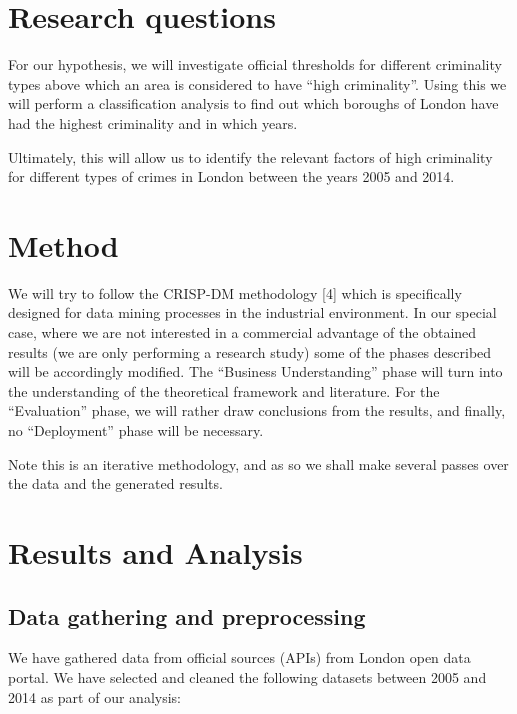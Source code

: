 \documentclass[12pt, openany]{report}
\begin{document}
\section{Research questions}

For our hypothesis, we will investigate official thresholds for different criminality types above which an area is considered to have “high criminality”. Using this we will perform a classification analysis to find out which boroughs of London have had the highest criminality and in which years.

Ultimately, this will allow us to identify the relevant factors of high criminality for different types of crimes in London between the years 2005 and 2014.

\section{Method}

We will try to follow the CRISP-DM methodology [4] which is specifically designed for data mining processes in the industrial environment. In our special case, where we are not interested in a commercial advantage of the obtained results (we are only performing a research study) some of the phases described will be accordingly modified. The “Business Understanding” phase will turn into the understanding of the theoretical framework and literature. For the “Evaluation” phase, we will rather draw conclusions from the results, and finally, no “Deployment” phase will be necessary.

Note this is an iterative methodology, and as so we shall make several passes over the data and the generated results.

\section{Results and Analysis}


\subsection{Data gathering and preprocessing}

We have gathered data from official sources (APIs) from London open data portal. We have selected and cleaned the following datasets between 2005 and 2014 as part of our analysis:
\end{document}
